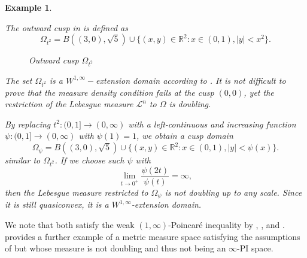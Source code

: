 \documentclass[reqno]{amsart}
\numberwithin{equation}{section}
\newtheorem{example}[theorem]{Example}
\theoremstyle{remark}
\newcommand{\R}{\mathbb{R}}
\begin{document}
\begin{example}\label{ex:2}
{\em The outward cusp in  is defined as
    \begin{equation}\label{eq:outward_cusp}
\Omega_{t^2}=B\left((3,0),\sqrt{5}\right)\cup\{(x,y)\in\R^2\colon  x\in (0,1), |y|<x^2\} .\end{equation}

\begin{figure}
\begin{center}
\end{center}
\caption{Outward cusp $\Omega_{t^2}$}
   \label{carpet:outwrd_cusp_2D}
\end{figure}




The set $\Omega_{t^2}$ is a $W^{1,\infty}-$extension domain according to . It is not difficult to prove that the measure density condition fails at the cusp $(0,0)$, yet the restriction of the Lebesgue measure $\mathcal L^n$ to $\Omega$ is doubling.

By replacing $t^2\colon (0, 1]\to(0, \infty)$ with a left-continuous and increasing function $\psi\colon (0, 1]\to(0, \infty)$ with $\psi(1)=1$, we obtain a cusp domain
\begin{equation*}
\Omega_{\psi}= B\left((3,0),\sqrt{5}\right) \cup \{(x,y)\in\R^2\colon x\in (0,1), |y|<\psi(x)\}.
\end{equation*}
similar to $\Omega_{t^2}$. If we choose such $\psi$ with 
\begin{equation}\label{eq:nondoubling}
\lim_{t\to 0^+}\frac{\psi(2t)}{\psi(t)}=\infty,
\end{equation}
then the Lebesgue measure restricted to $\Omega_{\psi}$ is not doubling up to any scale. Since it is still quasiconvex, it is a $W^{1, \infty}$-extension domain.}
\end{example}
We note that both  satisfy the weak $(1,\infty)$-Poincaré inequality by , , and .  provides a further example of a metric measure space satisfying the assumptions of  but whose measure is not doubling and thus not being an $\infty$-PI space. 
\end{document}
